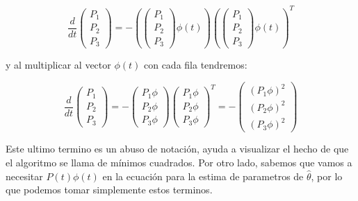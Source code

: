                 \begin{equation*}
                    \frac{d}{dt}
                    \begin{pmatrix}
                        P_1 \\
                        P_2 \\
                        P_3
                    \end{pmatrix} = - \left(
                    \begin{pmatrix}
                        P_1 \\
                        P_2 \\
                        P_3
                    \end{pmatrix} \phi(t) \right) \left(
                    \begin{pmatrix}
                        P_1 \\
                        P_2 \\
                        P_3
                        \end{pmatrix} \phi(t) \right)^T
                \end{equation*}

                y al multiplicar al vector $\phi(t)$ con cada fila tendremos:

                \begin{equation}
                    \frac{d}{dt}
                    \begin{pmatrix}
                        P_1 \\
                        P_2 \\
                        P_3
                    \end{pmatrix} = -
                    \begin{pmatrix}
                        P_1 \phi \\
                        P_2 \phi \\
                        P_3 \phi
                    \end{pmatrix}
                    \begin{pmatrix}
                        P_1 \phi \\
                        P_2 \phi \\
                        P_3 \phi
                    \end{pmatrix}^T = -
                    \begin{pmatrix}
                        (P_1 \phi)^2 \\
                        (P_2 \phi)^2 \\
                        (P_3 \phi)^2
                    \end{pmatrix}
                \end{equation}

                Este ultimo termino es un abuso de notación, ayuda a visualizar el hecho de que el algoritmo se llama de mínimos cuadrados.
                Por otro lado, sabemos que vamos a necesitar $P(t) \phi(t)$ en la ecuación para la estima de parametros de $\hat{\theta}$, por lo que podemos tomar simplemente estos terminos.
